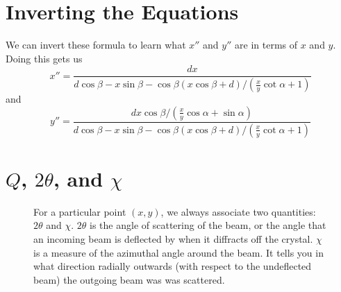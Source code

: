 \section{Inverting the Equations}

We can invert these formula to learn what
$x''$ and $y''$ are in terms of $x$ and $y$.
Doing this gets us
\begin{equation}\label{invertx}
    x''=\frac{dx}{d\cos\beta-x\sin\beta-
    \cos\beta(x\cos\beta+d)/(\tfrac{x}{y}\cot\alpha+1)}
\end{equation}
and
\begin{equation}\label{inverty}
    y''=\frac{dx\cos\beta/(\tfrac{x}{y}\cos\alpha+\sin\alpha)}
    {d\cos\beta-x\sin\beta-
    \cos\beta(x\cos\beta+d)/(\tfrac{x}{y}\cot\alpha+1)}
\end{equation}

\section{\texorpdfstring{$Q$, $2\theta$, and $\chi$}{Q, 2theta, and chi}}

\begin{SCfigure}[1][htb]
    \centering
    
    \caption{For a particular point $(x,y)$, we
    always associate two quantities: $2\theta$ and $\chi$.
    $2\theta$ is the angle of scattering 
    of the beam, or the angle that an incoming beam is 
    deflected by when it diffracts off the crystal. 
    $\chi$ is a measure of the azimuthal angle around 
    the beam. It tells you in what direction radially 
    outwards (with respect to the undeflected beam) 
    the outgoing beam was was scattered.}
    \label{TwoTheta}
\end{SCfigure}

